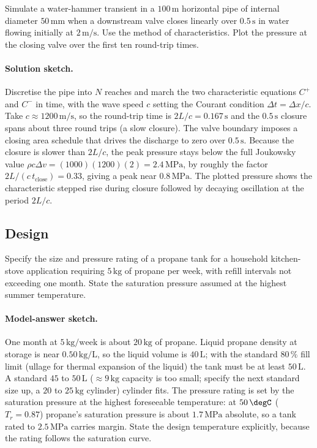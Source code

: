 \begin{exercise}
Simulate a water-hammer transient in a $100\,\text{m}$ horizontal
pipe of internal diameter $50\,\si{\milli\meter}$ when a downstream
valve closes linearly over $0.5\,\text{s}$ in water flowing initially
at $2\,\text{m}/\text{s}$. Use the method of characteristics. Plot
the pressure at the closing valve over the first ten round-trip
times.

\paragraph{Solution sketch.} Discretise the pipe into $N$ reaches and
march the two characteristic equations $C^{+}$ and $C^{-}$ in time, with
the wave speed $c$ setting the Courant condition $\Delta t = \Delta x/c$.
Take $c \approx 1200\,\text{m}/\text{s}$, so the round-trip time is
$2L/c = 0.167\,\text{s}$ and the $0.5\,\text{s}$ closure spans about three
round trips (a slow closure). The valve boundary imposes a closing area
schedule that drives the discharge to zero over $0.5\,\text{s}$. Because
the closure is slower than $2L/c$, the peak pressure stays below the full
Joukowsky value $\rho c \Delta v = (1000)(1200)(2) = 2.4\,\text{MPa}$, by
roughly the factor $2L/(c\,t_{\text{close}}) = 0.33$, giving a peak near
$0.8\,\text{MPa}$. The plotted pressure shows the characteristic stepped
rise during closure followed by decaying oscillation at the period $2L/c$.
\end{exercise}

\subsection*{Design}

\begin{exercise}
Specify the size and pressure rating of a propane tank for a
household kitchen-stove application requiring $5\,\text{kg}$ of
propane per week, with refill intervals not exceeding one month.
State the saturation pressure assumed at the highest summer
temperature.

\paragraph{Model-answer sketch.} One month at $5\,\text{kg}/\text{week}$
is about $20\,\text{kg}$ of propane. Liquid propane density at storage is
near $0.50\,\text{kg}/\text{L}$, so the liquid volume is $40\,\text{L}$;
with the standard $80\,\%$ fill limit (ullage for thermal expansion of
the liquid) the tank must be at least $50\,\text{L}$. A standard $45$ to
$50\,\text{L}$ ($\approx 9\,\text{kg}$ capacity is too small; specify the
next standard size up, a $20$ to $25\,\text{kg}$ cylinder) cylinder fits.
The pressure rating is set by the saturation pressure at the highest
foreseeable temperature: at $50\,\degC$ ($T_r = 0.87$) propane's
saturation pressure is about $1.7\,\text{MPa}$ absolute, so a tank rated
to $2.5\,\text{MPa}$ carries margin. State the design temperature
explicitly, because the rating follows the saturation curve.
\end{exercise}

